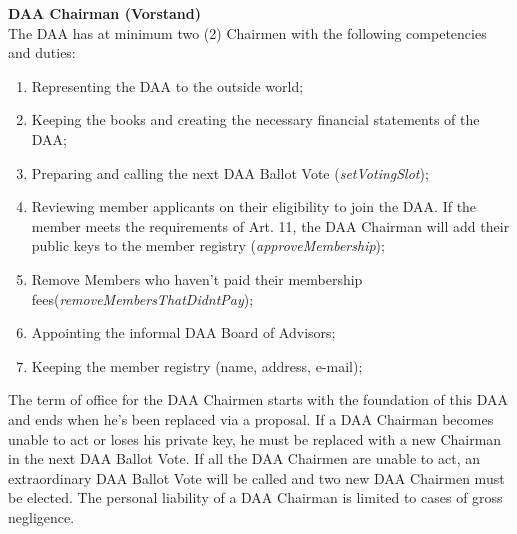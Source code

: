 \item \textbf{DAA Chairman (Vorstand)} \\
The DAA has at minimum two (2) Chairmen with the following competencies and duties:
\begin{enumerate}
    [label=(\alph*)]
    \item Representing the DAA to the outside world;
    \item Keeping the books and creating the necessary financial statements of the DAA;
    \item Preparing and calling the next DAA Ballot Vote (\emph{setVotingSlot});
    \item Reviewing member applicants on their eligibility to join the DAA.
          If the member meets the requirements of Art. 11, the DAA Chairman will add their public keys to the member registry (\emph{approveMembership});
    \item Remove Members who haven't paid their membership fees(\emph{removeMembersThatDidntPay});
    \item Appointing the informal DAA Board of Advisors; %
    \item Keeping the member registry (name, address, e-mail); %
\end{enumerate}
The term of office for the DAA Chairmen starts with the foundation of this DAA and ends when he's been replaced via a proposal.
If a DAA Chairman becomes unable to act or loses his private key, he must be replaced with a new Chairman in the next DAA Ballot Vote.
If all the DAA Chairmen are unable to act, an extraordinary DAA Ballot Vote will be called and two new DAA Chairmen must be elected.
The personal liability of a DAA Chairman is limited to cases of gross negligence.

